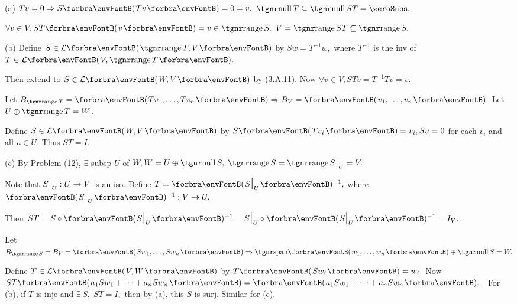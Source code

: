 \par\quad
(a) $Tv=0\Rightarrow S\Par{Tv}=0=v.$ \Or $\null T\subseteq\null ST=\zeroSubs.$\par\quad\Ha
$\forall v\in V,ST\Par{v}=v\in\range S.$ \;\Or $V=\range ST\subseteq\range S.$\par\vspace{4pt}\quad
(b) Define $S\in\Lm{\range T,V}$ by $Sw=T^{-1}w,$ {where $T^{-1}$ is the inv of $T\in\Lm{V,\range T}.$}\par\quad\Hb
Then extend to $S\in\Lm{W,V}$ by (3.A.11). Now $\forall v\in V,STv=T^{-1}Tv=v.$\par\vspace{4pt}\quad\Hb
\Or {} \;Let $B_{\range T}=\Par{Tv_1,\dots,Tv_n}\Rightarrow B_V=\Par{v_1,\dots,v_n}.$ Let $U\oplus\range T=W$.\par\quad\Hb
Define $S\in\Lm{W,V}$ by $S\Par{Tv_i}=v_i,Su=0$ for each $v_i$ and all $u\in U.$ Thus $ST=I.$\par\vspace{6pt}\quad
(c) By Problem (12), $\exists$ subsp $U$ of $W,W=U\oplus\null S,\;\range S=\range S\mmid_U=V.$\par\quad\Hc
Note that $S\text{\Large|}_U:U\rightarrow V$ is an iso. Define $T=\Par{S\mmid_U}{^{-1}},$ where $\Par{S\mmid_U}{^{-1}}:V\rightarrow U.$\par\quad\Hc
Then $ST=S\circ\Par{S\mmid_U}{^{-1}}=S\mmid_U\circ\Par{S\mmid_U}{^{-1}}=I_V.$\par\vspace{4pt}\quad\Hc
\Or {} \;Let $B_{\range S}=B_{V}=\Par{Sw_1,\dots,Sw_n}\Rightarrow\Span{w_1,\dots,w_n}\oplus\null S=W.$\par\quad\Hc
Define $T\in\Lm{V,W}$ by $T\Par{Sw_i}=w_i.$ Now $ST\Par{a_1Sw_1+\dots+a_nSw_n}=\Par{a_1Sw_1+\dots+a_nSw_n}.$\PfEnd\vspace{4pt}
\Corollary \,\,\,For (b), if $T$ is inje and $\exists\,S,\;ST=I,$ then by (a), this $S$ is surj. Similar for (c).\vspace{-3pt}
\SepLine


